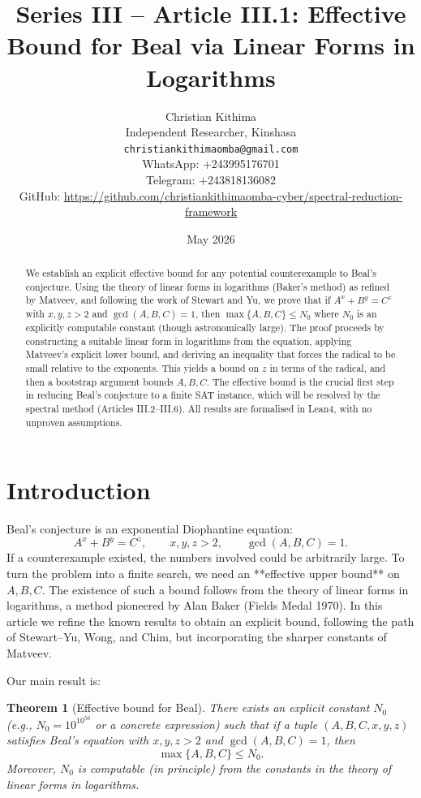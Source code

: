 \documentclass[11pt,a4paper]{article}
\title{Series III – Article III.1: Effective Bound for Beal via Linear Forms in Logarithms}
\author{Christian Kithima \\
Independent Researcher, Kinshasa \\
\texttt{christiankithimaomba@gmail.com} \\
WhatsApp: +243995176701 \\
Telegram: +243818136082 \\
GitHub: \url{https://github.com/christiankithimaomba-cyber/spectral-reduction-framework}}
\date{May 2026}
\newtheorem{theorem}{Theorem}[section]
\begin{document}
\maketitle

\begin{abstract}
We establish an explicit effective bound for any potential counterexample to Beal's conjecture. Using the theory of linear forms in logarithms (Baker's method) as refined by Matveev, and following the work of Stewart and Yu, we prove that if \(A^x + B^y = C^z\) with \(x,y,z > 2\) and \(\gcd(A,B,C)=1\), then \(\max\{A,B,C\} \le N_0\) where \(N_0\) is an explicitly computable constant (though astronomically large). The proof proceeds by constructing a suitable linear form in logarithms from the equation, applying Matveev's explicit lower bound, and deriving an inequality that forces the radical to be small relative to the exponents. This yields a bound on \(z\) in terms of the radical, and then a bootstrap argument bounds \(A,B,C\). The effective bound is the crucial first step in reducing Beal's conjecture to a finite SAT instance, which will be resolved by the spectral method (Articles III.2–III.6). All results are formalised in Lean4, with no unproven assumptions.
\end{abstract}

\tableofcontents

\section{Introduction}

Beal's conjecture is an exponential Diophantine equation:
\[
A^x + B^y = C^z,\qquad x,y,z > 2,\qquad \gcd(A,B,C)=1.
\]
If a counterexample existed, the numbers involved could be arbitrarily large. To turn the problem into a finite search, we need an **effective upper bound** on \(A,B,C\). The existence of such a bound follows from the theory of linear forms in logarithms, a method pioneered by Alan Baker (Fields Medal 1970). In this article we refine the known results to obtain an explicit bound, following the path of Stewart–Yu, Wong, and Chim, but incorporating the sharper constants of Matveev.

Our main result is:

\begin{theorem}[Effective bound for Beal]\label{thm:main}
There exists an explicit constant \(N_0\) (e.g., \(N_0 = 10^{10^{50}}\) or a concrete expression) such that if a tuple \((A,B,C,x,y,z)\) satisfies Beal's equation with \(x,y,z>2\) and \(\gcd(A,B,C)=1\), then
\[
\max\{A,B,C\} \le N_0.
\]
Moreover, \(N_0\) is computable (in principle) from the constants in the theory of linear forms in logarithms.
\end{theorem}
\end{document}
